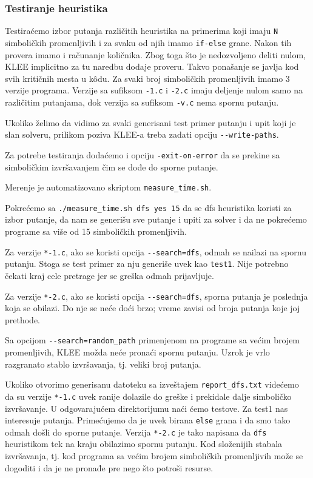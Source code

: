 \subsubsection{Testiranje heuristika}\label{testiranje-heuristika}

Testiraćemo izbor putanja različitih heuristika na primerima koji imaju \texttt{N} simboličkih promenljivih i za svaku od njih imamo \texttt{if-else} grane. Nakon tih provera imamo i računanje količnika. Zbog toga što je nedozvoljeno deliti nulom, KLEE implicitno za tu naredbu dodaje proveru. Takvo ponašanje se javlja kod svih kritičnih mesta u kôdu. Za svaki broj simboličkih promenljivih imamo 3 verzije programa. Verzije sa sufiksom \texttt{-1.c} i \texttt{-2.c} imaju deljenje nulom samo na različitim putanjama, dok verzija sa sufiksom \texttt{-v.c} nema spornu putanju.

Ukoliko želimo da vidimo za svaki generisani test primer putanju i upit koji je slan solveru, prilikom poziva KLEE-a treba zadati opciju \texttt{-{}-write-paths}.

Za potrebe testiranja dodaćemo i opciju \texttt{-exit-on-error} da se prekine sa simboličkim izvršavanjem čim se dođe do sporne putanje.

Merenje je automatizovano skriptom \texttt{measure\_time.sh}.

Pokrećemo sa \texttt{./measure\_time.sh\ dfs\ yes\ 15} da se dfs heuristika koristi za izbor putanje, da nam se generišu sve putanje i upiti za solver i da ne pokrećemo programe sa više od 15 simboličkih promenljivih.

Za verzije \texttt{*-1.c}, ako se koristi opcija \texttt{-{}-search=dfs}, odmah se nailazi na spornu putanju. Stoga se test primer za nju generiše uvek kao \texttt{test1}. Nije potrebno čekati kraj cele pretrage jer se greška odmah prijavljuje.

Za verzije \texttt{*-2.c}, ako se koristi opcija \texttt{-{}-search=dfs}, sporna putanja je poslednja koja se obilazi. Do nje se neće doći brzo; vreme zavisi od broja putanja koje joj prethode.

Sa opcijom \texttt{-{}-search=random\_path} primenjenom na programe sa većim brojem promenljivih, KLEE možda neće pronaći spornu putanju. Uzrok je vrlo razgranato stablo izvršavanja, tj. veliki broj putanja.

Ukoliko otvorimo generisanu datoteku sa izveštajem \texttt{report\_dfs.txt} videćemo da su verzije \texttt{*-1.c} uvek ranije dolazile do greške i prekidale dalje simboličko izvršavanje. U odgovarajućem direktorijumu naći ćemo testove. Za test1 nas interesuje putanja. Primećujemo da je uvek birana \texttt{else} grana i da smo tako odmah došli do sporne putanje. Verzija \texttt{*-2.c} je tako napisana da \texttt{dfs} heuristikom tek na kraju obilazimo spornu putanju. Kod složenijih stabala izvršavanja, tj. kod programa sa većim brojem simboličkih promenljivih može se dogoditi i da je ne pronađe pre nego što potroši resurse.

